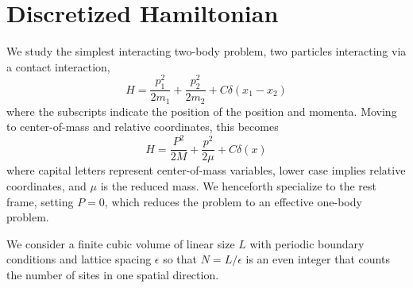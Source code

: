 \section{Discretized Hamiltonian}\label{sec:hamiltonian}

We study the simplest interacting two-body problem, two particles interacting via a contact interaction,
\begin{equation}
    H = \frac{p_1^2}{2 m_1} + \frac{p_2^2}{2 m_2} + C \delta(x_1-x_2)
\end{equation}
where the subscripts indicate the position of the position and momenta.  Moving to center-of-mass and relative coordinates, this becomes
\begin{equation}
    H = \frac{P^2}{2 M} + \frac{p^2}{2 \mu} + C \delta(x)
\end{equation}
where capital letters represent center-of-mass variables, lower case implies relative coordinates, and $\mu$ is the reduced mass.  We henceforth specialize to the rest frame, setting $P=0$, which reduces the problem to an effective one-body problem.

We consider a finite cubic volume of linear size $L$ with periodic boundary conditions and lattice spacing $\epsilon$ so that $N=L/\epsilon$ is an even integer that counts the number of sites in one spatial direction.

